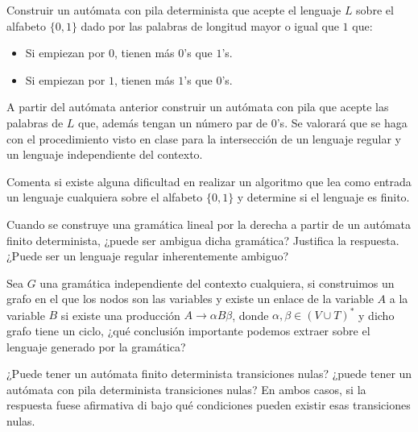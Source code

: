 \documentclass[12pt]{article}
\begin{document}
    \begin{ejercicio}[2.5 puntos]
        Construir un autómata con pila determinista que acepte el lenguaje $L$ sobre el alfabeto $\{0, 1\}$ dado por las palabras de
        longitud mayor o igual que $1$ que:
        \begin{itemize}
            \item Si empiezan por $0$, tienen más $0$'s que $1$'s.
            \item Si empiezan por $1$, tienen más $1$'s que $0$'s.
        \end{itemize}
        A partir del autómata anterior construir un autómata con pila que acepte las palabras de $L$ que, además tengan un
        número par de $0$'s. Se valorará que se haga con el procedimiento visto en clase para la intersección de un lenguaje
        regular y un lenguaje independiente del contexto.
    \end{ejercicio}

    \begin{ejercicio}[1.25 puntos]
        Comenta si existe alguna dificultad en realizar un algoritmo que lea como entrada un lenguaje cualquiera sobre el
        alfabeto $\{0, 1\}$ y determine si el lenguaje es finito.
    \end{ejercicio}

    \begin{ejercicio}[1.25 puntos]
        Cuando se construye una gramática lineal por la derecha a partir de un autómata finito determinista, ¿puede ser ambigua
        dicha gramática? Justifica la respuesta. ¿Puede ser un lenguaje regular inherentemente ambiguo?
    \end{ejercicio}

    \begin{ejercicio}[1.25 puntos]
        Sea $G$ una gramática independiente del contexto cualquiera, si construimos un grafo en el que los nodos son las variables
        y existe un enlace de la variable $A$ a la variable $B$ si existe una producción $A \to \alpha B \beta$, donde $\alpha, \beta \in (V \cup T)^*$
        y dicho grafo tiene un ciclo, ¿qué conclusión importante podemos extraer sobre el lenguaje generado por la gramática?
    \end{ejercicio}

    \begin{ejercicio}[1.25 puntos]
        ¿Puede tener un autómata finito determinista transiciones nulas? ¿puede tener un autómata con pila determinista
        transiciones nulas? En ambos casos, si la respuesta fuese afirmativa di bajo qué condiciones pueden existir esas transiciones nulas.
    \end{ejercicio}
\end{document}

